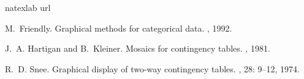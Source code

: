 \documentclass[a4paper]{report}
\begin{document}
\begin{article}
\begin{thebibliography}{3}
\expandafter\ifx\csname natexlab\endcsname\relax\def\natexlab#1{#1}\fi
\expandafter\ifx\csname url\endcsname\relax
  \def\url#1{{\tt #1}}\fi

M.~Friendly.
\newblock Graphical methods for categorical data.
, 1992.

J.~A. Hartigan and B.~Kleiner.
\newblock Mosaics for contingency tables.
, 1981.

R.~D. Snee.
\newblock Graphical display of two-way contingency tables.
, 28: 9--12, 1974.

\end{thebibliography}

  

\end{article}
\end{document}

